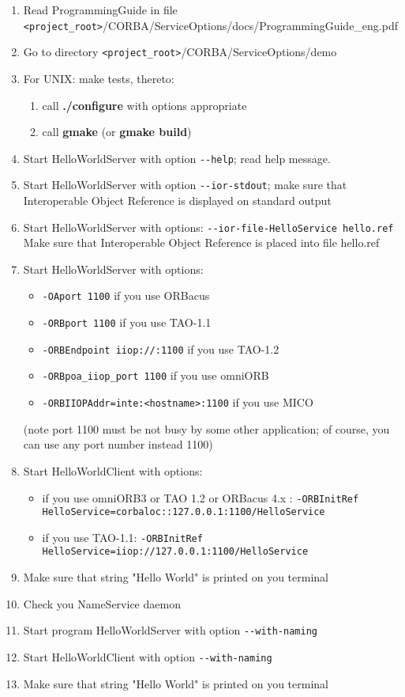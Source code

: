 \documentclass[10pt]{article}
\begin{document}
\begin{enumerate}
 \item Read ProgrammingGuide in file \newline
 \verb|<project_root>|/CORBA/ServiceOptions/docs/ProgrammingGuide\_eng.pdf
 \item Go to directory \verb|<project_root>|/CORBA/ServiceOptions/demo
 \item For UNIX: make tests, thereto:
       \begin{enumerate}
       \item call {\bf ./configure} with options appropriate
       \item call {\bf gmake} (or {\bf gmake build})
       \end{enumerate}
 \item Start HelloWorldServer with option \verb|--help|; read help message.
 \item Start HelloWorldServer with option \verb|--ior-stdout|;
 make sure that Interoperable Object Reference is displayed on standard output 
 \item Start HelloWorldServer with options: \verb|--ior-file-HelloService hello.ref|
 Make sure that Interoperable Object Reference is placed into file hello.ref 
 \item Start HelloWorldServer with options: 
  \begin{itemize}
    \item \verb|-OAport 1100| if you use ORBacus
    \item \verb|-ORBport 1100| if you use TAO-1.1
    \item \verb|-ORBEndpoint iiop://:1100| if you use TAO-1.2
    \item \verb|-ORBpoa_iiop_port 1100| if you use omniORB
    \item \verb|-ORBIIOPAddr=inte:<hostname>:1100| if you use MICO
  \end{itemize}
  (note port 1100 must be not busy by some other application; of course, you can
  use any port number instead 1100)
 \item Start HelloWorldClient with options: 
  \begin{itemize}
    \item if you use omniORB3 or TAO 1.2 or ORBacus 4.x : 
   \newline\verb|-ORBInitRef HelloService=corbaloc::127.0.0.1:1100/HelloService|
    \item if you use TAO-1.1: 
   \newline\verb|-ORBInitRef HelloService=iiop://127.0.0.1:1100/HelloService|
  \end{itemize}
 \item Make sure that string "Hello World" is printed on you terminal
 \item Check you NameService daemon
 \item Start program HelloWorldServer with option \verb|--with-naming|
 \item Start HelloWorldClient with option \verb|--with-naming|
 \item Make sure that string "Hello World" is printed on you terminal
\end{enumerate}
\end{document}
